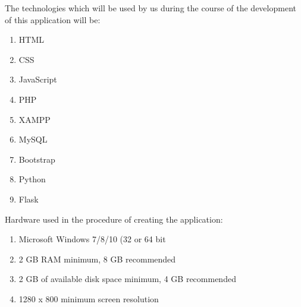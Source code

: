 The technologies which will be used by us during the course of the development of this application will be:  

\begin{enumerate}
	\item HTML 
	\item CSS 
	\item JavaScript
	\item PHP 
	\item XAMPP
	\item MySQL 
	\item Bootstrap
	\item Python
	\item Flask
\end{enumerate}

Hardware used in the procedure of creating the application:  

\begin{enumerate}
	\item Microsoft Windows 7/8/10 (32 or 64 bit 
	\item 2 GB RAM minimum, 8 GB recommended  
	\item 2 GB of available disk space minimum, 4 GB recommended
	\item 1280 x 800 minimum screen resolution 
	
\end{enumerate}


 

  

 








